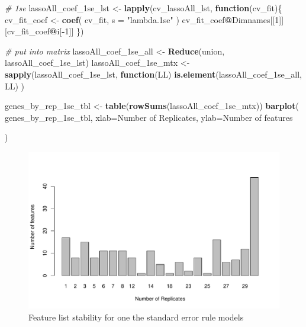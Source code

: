 \documentclass[
]{book}
\newenvironment{Shaded}{\begin{snugshade}}{\end{snugshade}}
\newcommand{\CommentTok}[1]{\textcolor[rgb]{0.56,0.35,0.01}{\textit{#1}}}
\newcommand{\ControlFlowTok}[1]{\textcolor[rgb]{0.13,0.29,0.53}{\textbf{#1}}}
\newcommand{\DataTypeTok}[1]{\textcolor[rgb]{0.13,0.29,0.53}{#1}}
\newcommand{\DecValTok}[1]{\textcolor[rgb]{0.00,0.00,0.81}{#1}}
\newcommand{\KeywordTok}[1]{\textcolor[rgb]{0.13,0.29,0.53}{\textbf{#1}}}
\newcommand{\NormalTok}[1]{#1}
\newcommand{\OperatorTok}[1]{\textcolor[rgb]{0.81,0.36,0.00}{\textbf{#1}}}
\newcommand{\StringTok}[1]{\textcolor[rgb]{0.31,0.60,0.02}{#1}}
\begin{document}
\begin{Shaded}
\begin{Highlighting}[]
\CommentTok{\# 1se}
\NormalTok{lassoAll\_coef\_1se\_lst <{-}}\StringTok{ }\KeywordTok{lapply}\NormalTok{(cv\_lassoAll\_lst, }\ControlFlowTok{function}\NormalTok{(cv\_fit)\{}
\NormalTok{ cv\_fit\_coef <{-}}\StringTok{ }\KeywordTok{coef}\NormalTok{(}
\NormalTok{ cv\_fit,}
 \DataTypeTok{s =} \StringTok{"lambda.1se"}
\NormalTok{ )}
\NormalTok{ cv\_fit\_coef}\OperatorTok{@}\NormalTok{Dimnames[[}\DecValTok{1}\NormalTok{]][cv\_fit\_coef}\OperatorTok{@}\NormalTok{i[}\OperatorTok{{-}}\DecValTok{1}\NormalTok{]]}
\NormalTok{ \})}

\CommentTok{\# put into matrix}
\NormalTok{lassoAll\_coef\_1se\_all <{-}}\StringTok{ }\KeywordTok{Reduce}\NormalTok{(union, lassoAll\_coef\_1se\_lst)}
\NormalTok{lassoAll\_coef\_1se\_mtx <{-}}\StringTok{ }\KeywordTok{sapply}\NormalTok{(lassoAll\_coef\_1se\_lst, }
  \ControlFlowTok{function}\NormalTok{(LL) }\KeywordTok{is.element}\NormalTok{(lassoAll\_coef\_1se\_all, LL)}
\NormalTok{)}

\NormalTok{genes\_by\_rep\_1se\_tbl <{-}}\StringTok{ }\KeywordTok{table}\NormalTok{(}\KeywordTok{rowSums}\NormalTok{(lassoAll\_coef\_1se\_mtx))}
\KeywordTok{barplot}\NormalTok{(}
\NormalTok{ genes\_by\_rep\_1se\_tbl,}
 \DataTypeTok{xlab=}\StringTok{\textquotesingle{}Number of Replicates\textquotesingle{}}\NormalTok{,}
 \DataTypeTok{ylab=}\StringTok{\textquotesingle{}Number of features\textquotesingle{}}

\NormalTok{)}
\end{Highlighting}
\end{Shaded}

\begin{figure}
\centering
\includegraphics{Static/figures/feature-list-1se-1.pdf}
\caption{\label{fig:feature-list-1se}Feature list stability for one the standard error rule models}
\end{figure}
\end{document}
